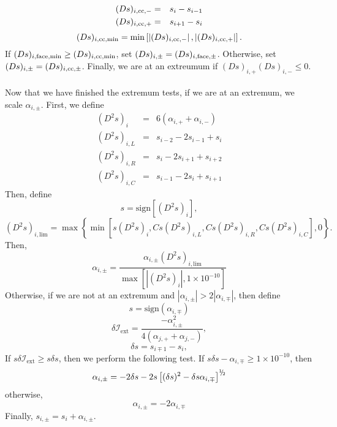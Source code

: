 \begin{eqnarray}
(Ds)_{i,{\rm cc},-} &=& s_{i} - s_{i-1} \\
(Ds)_{i,{\rm cc},+} &=& s_{i+1} - s_{i}
\end{eqnarray}
\begin{equation}
(Ds)_{i,{\rm cc,min}} = \min\left[\left|(Ds)_{i,{\rm cc},-}\right|,\left|(Ds)_{i,{\rm cc},+}\right|\right].
\end{equation}
If $(Ds)_{i,{\rm face,min}} \ge (Ds)_{i,{\rm cc,min}}$, set 
$(Ds)_{i,\pm} = (Ds)_{i,{\rm face},\pm}$.  Otherwise, set 
$(Ds)_{i,\pm} = (Ds)_{i,{\rm cc},\pm}$.  Finally, we are at an extreumum if
$(Ds)_{i,+}(Ds)_{i,-} \le 0$.\\ \\

Now that we have finished the extremum tests, if we are at an extremum,
we scale $\alpha_{i,\pm}$.  First, we define
\begin{eqnarray}
(D^2s)_{i} &=& 6(\alpha_{i,+}+\alpha_{i,-}) \\
(D^2s)_{i,L} &=& s_{i-2}-2s_{i-1}+s_{i} \\
(D^2s)_{i,R} &=& s_{i}-2s_{i+1}+s_{i+2} \\
(D^2s)_{i,C} &=& s_{i-1}-2s_{i}+s_{i+1}
\end{eqnarray}
Then, define
\begin{equation}
s = \text{sign}\left[(D^2s)_{i}\right],
\end{equation}
\begin{equation}
(D^2s)_{i,\text{lim}} = \max\left\{\min\left[s(D^2s)_{i},Cs(D^2s)_{i,L},Cs(D^2s)_{i,R},Cs(D^2s)_{i,C}\right],0\right\}.
\end{equation}
Then,
\begin{equation}
\alpha_{i,\pm} = \frac{\alpha_{i,\pm}(D^2s)_{i,\text{lim}}}{\max\left[\left|(D^2s)_{i}\right|,1\times 10^{-10}\right]}
\end{equation}
Otherwise, if we are not at an extremum and $|\alpha_{i,\pm}| > 2|\alpha_{i,\mp}|$,
then define
\begin{equation}
s = \text{sign}(\alpha_{i,\mp})
\end{equation}
\begin{equation}
\delta\mathcal{I}_{\text{ext}} = \frac{-\alpha_{i,\pm}^2}{4\left(\alpha_{j,+}+\alpha_{j,-}\right)},
\end{equation}
\begin{equation}
\delta s = s_{i\mp 1} - s_i,
\end{equation}
If $s\delta\mathcal{I}_{\text{ext}} \ge s\delta s$, then we perform the following test.
If $s\delta s - \alpha_{i,\mp} \ge 1\times 10^{-10}$, then
\begin{equation}
\alpha_{i,\pm} =  -2\delta s - 2s\left[(\delta s)^2 - \delta s \alpha_{i,\mp}\right]^{\myhalf}
\end{equation}
otherwise,
\begin{equation}
\alpha_{i,\pm} =  -2\alpha_{i,\mp}
\end{equation}
Finally, $s_{i,\pm} = s_i + \alpha_{i,\pm}$.
